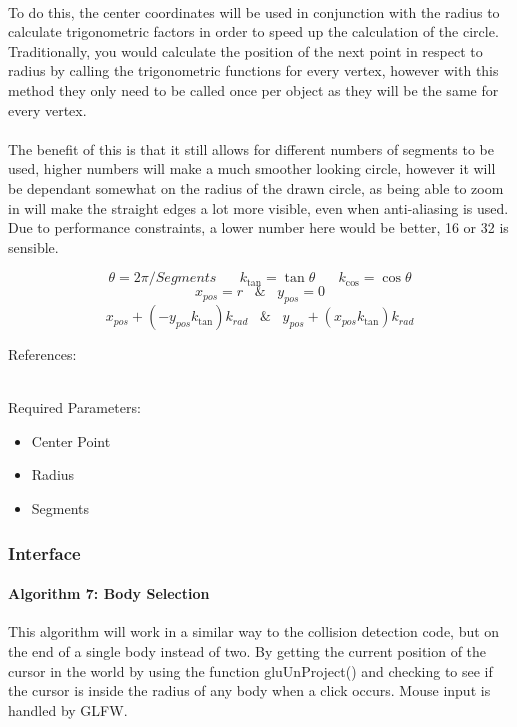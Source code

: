 \paragraph{}
To do this, the center coordinates will be used in conjunction with the radius to calculate trigonometric factors in order to speed up the calculation of the circle. Traditionally, you would calculate the position of the next point in respect to radius by calling the trigonometric functions for every vertex, however with this method they only need to be called once per object as they will be the same for every vertex.

\paragraph{}
The benefit of this is that it still allows for different numbers of segments to be used, higher numbers will make a much smoother looking circle, however it will be dependant somewhat on the radius of the drawn circle, as being able to zoom in will make the straight edges a lot more visible, even when anti-aliasing is used. Due to performance constraints, a lower number here would be better, 16 or 32 is sensible.

$$ \theta=2\pi/Segments \hspace{20pt} k_{\tan}=\tan\theta \hspace{20pt} k_{\cos}=\cos\theta $$
$$ x_{pos} = r \hspace{10pt} \& \hspace{10pt} y_{pos} = 0 $$
$$ x_{pos}+(-y_{pos}k_{\tan})k_{rad} \hspace{10pt} \& \hspace{10pt} y_{pos}+(x_{pos}k_{\tan})k_{rad}$$

References: \cite{circle} \\\

Required Parameters:
\begin{itemize}
\item Center Point
\item Radius
\item Segments
\end{itemize}

\pagebreak
\subsubsection{Interface}
\paragraph{Algorithm 7: Body Selection}
This algorithm will work in a similar way to the collision detection code, but on the end of a single body instead of two. By getting the current position of the cursor in the world by using the function gluUnProject() and checking to see if the cursor is inside the radius of any body when a click occurs. Mouse input is handled by GLFW.

